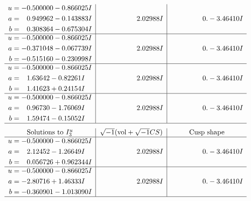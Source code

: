 \documentclass[1p]{elsarticle_modified}
\theoremstyle{definition}
\newcommand{\I}{\sqrt{-1}}
\begin{document}
$$\begin{array}{c|c|c}
\begin{aligned}
u &= -0.500000 - 0.866025 I \\
a &= \phantom{-}0.949962 - 0.143883 I \\
b &= \phantom{-}0.308364 - 0.675304 I\end{aligned}
 & \phantom{-0.000000 -}2.02988 I & \phantom{-0.000000 } 0. - 3.46410 I \\ \hline\begin{aligned}
u &= -0.500000 - 0.866025 I \\
a &= -0.371048 - 0.067739 I \\
b &= -0.515160 - 0.230998 I\end{aligned}
 & \phantom{-0.000000 -}2.02988 I & \phantom{-0.000000 } 0. - 3.46410 I \\ \hline\begin{aligned}
u &= -0.500000 - 0.866025 I \\
a &= \phantom{-}1.63642 - 0.82261 I \\
b &= \phantom{-}1.41623 + 0.24154 I\end{aligned}
 & \phantom{-0.000000 -}2.02988 I & \phantom{-0.000000 } 0. - 3.46410 I \\ \hline\begin{aligned}
u &= -0.500000 - 0.866025 I \\
a &= \phantom{-}0.96730 - 1.76069 I \\
b &= \phantom{-}1.59474 - 0.15052 I\end{aligned}
 & \phantom{-0.000000 -}2.02988 I & \phantom{-0.000000 } 0. - 3.46410 I\\
 \hline 
 \end{array}$$\newpage$$\begin{array}{c|c|c}  
\text{Solutions to }I^u_{3}& \I (\text{vol} + \sqrt{-1}CS) & \text{Cusp shape}\\
 \hline 
\begin{aligned}
u &= -0.500000 - 0.866025 I \\
a &= \phantom{-}2.12452 - 1.26649 I \\
b &= \phantom{-}0.056726 + 0.962344 I\end{aligned}
 & \phantom{-0.000000 -}2.02988 I & \phantom{-0.000000 } 0. - 3.46410 I \\ \hline\begin{aligned}
u &= -0.500000 - 0.866025 I \\
a &= -2.80716 + 1.46333 I \\
b &= -0.360901 - 1.013090 I\end{aligned}
 & \phantom{-0.000000 -}2.02988 I & \phantom{-0.000000 } 0. - 3.46410 I\\
 \hline 
 \end{array}$$\newpage\newpage\renewcommand{\arraystretch}{1}
\end{document}
